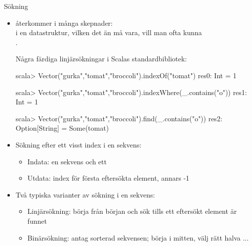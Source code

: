 


\begin{Slide}{Sökning}\SlideFontSmall

\begin{itemize}
\item {} återkommer i många skepnader: \\ i en datastruktur, vilken det än må vara, vill man ofta kunna \\ .

\pause
Några färdiga linjärsökningar i Scalas standardbibliotek:

\begin{REPL}
scala> Vector("gurka","tomat","broccoli").indexOf("tomat")
res0: Int = 1

scala> Vector("gurka","tomat","broccoli").indexWhere(_.contains("o"))
res1: Int = 1

scala> Vector("gurka","tomat","broccoli").find(_.contains("o"))
res2: Option[String] = Some(tomat)
\end{REPL}

\pause
\item Sökning efter ett visst index i en sekvens:

\begin{itemize}\SlideFontTiny
\item Indata: en sekvens och ett 
\item Utdata: index för första eftersökta element, annars -1
\end{itemize}

\pause
\item Två typiska varianter av sökning i en sekvens:
\begin{itemize}\SlideFontTiny
\item Linjärsökning: börja från början och sök tills ett eftersökt element är funnet
\item Binärsökning: antag sorterad sekvensen; börja i mitten, välj rätt halva ...
\end{itemize}
\end{itemize}
\end{Slide}


